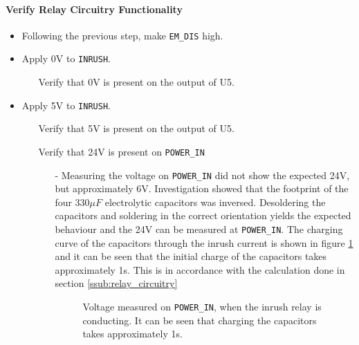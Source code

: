 \paragraph{Verify Relay Circuitry Functionality} %
\label{par:verify_relay_circuitry}
\begin{itemize}
	\item Following the previous step, make \texttt{EM\_DIS} high.
	\item Apply 0V to \texttt{INRUSH}.
	\begin{itemize}
		\item[\cmark] Verify that 0V is present on the output of U5.
	\end{itemize}
	\item Apply 5V to \texttt{INRUSH}.
	\begin{itemize}
		\item[\cmark] Verify that 5V is present on the output of U5.
		\item[\xmark] Verify that 24V is present on \texttt{POWER\_IN}
		\begin{itemize}
			\item[-]  Measuring the voltage on \texttt{POWER\_IN} did not show the expected 24V, but approximately 6V. 
			Investigation showed that the footprint of the four $330 \mu F$ electrolytic capacitors was inversed. 
			Desoldering the capacitors and soldering in the correct orientation yields the expected behaviour and the 24V can be measured at \texttt{POWER\_IN}.
			The charging curve of the capacitors through the inrush current is shown in figure 
			\ref{fig:controllerboardv2_inrushcurrent_charge} and it can be seen that the initial charge of the capacitors takes approximately 1s.
			This is in accordance with the calculation done in section \ref{ssub:relay_circuitry}

			\begin{figure}[h]
				\centering
				\caption[Chargin curve of Capacitor bank.]{Voltage measured on \texttt{POWER\_IN}, when the inrush relay is conducting. It can be seen that charging the capacitors takes approximately 1s. }
				\label{fig:controllerboardv2_inrushcurrent_charge}
			\end{figure}
 

\end{itemize}
\end{itemize}
\end{itemize}
